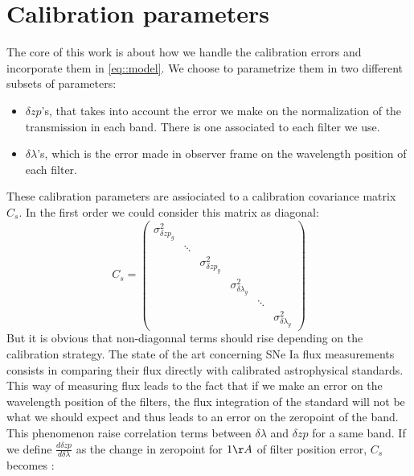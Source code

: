 \documentclass[\docopts]{\docclass}
\begin{document}
\section{Calibration parameters}
\label{sec::calib_uncertainties}
The core of this work is about how we handle the calibration errors and incorporate them in \ref{eq::model}.
We choose to parametrize them in two different subsets of parameters:
\begin{itemize}
\item $\delta zp$'s, that takes into account the error we make on the normalization of the transmission in each band.
There is one associated to each filter we use.
\item $\delta \lambda$'s, which is the error made in observer frame on the wavelength position of each filter. 
\end{itemize}
These calibration parameters are assiociated to a calibration covariance matrix $C_s$.
In the first order we could consider this matrix as diagonal:
\begin{equation}
C_s = 
\begin{pmatrix}
   \sigma^2_{\delta zp_{g}} & \ & \ & \ & \ & \ \\
   \ & \ddots & \ & \ & \ & \ \\
   \ & \ & \sigma^2_{\delta zp_{y}} & \ & \ & \ \\
   \ & \ & \ & \sigma^2_{\delta\lambda_{g}} & \ & \ \\
   \ & \ & \ & \ & \ddots & \ \\
   \ & \ & \ & \ & \ & \sigma^2_{\delta\lambda_{y}}
\end{pmatrix}
\end{equation}
But it is obvious that non-diagonnal terms should rise depending on the calibration strategy.
The state of the art concerning SNe Ia flux measurements consists in comparing their flux directly with calibrated astrophysical standards.
This way of measuring flux leads to the fact that if we make an error on the wavelength position of the filters, the flux integration of the standard will not be what we should expect and thus leads to an error on the zeropoint of the band.
This phenomenon raise correlation terms between $\delta \lambda$ and $\delta zp$ for a same band. If we define $\frac{d \delta zp}{d \delta \lambda}$ as the change in zeropoint for $1\AA$ of filter position error, $C_s$ becomes :
\end{document}

